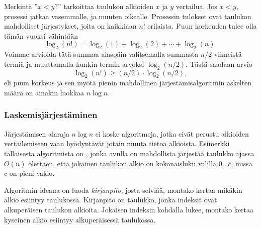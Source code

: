 Merkintä ''$x<y?$'' tarkoittaa taulukon alkioiden
$x$ ja $y$ vertailua.
Jos $x<y$, prosessi jatkaa vasemmalle,
ja muuten oikealle.
Prosessin tulokset ovat taulukon mahdolliset
järjestykset, joita on kaikkiaan $n!$ erilaista.
Puun korkeuden tulee olla tämän vuoksi vähintään
\[ \log_2(n!) = \log_2(1)+\log_2(2)+\cdots+\log_2(n).\]
Voimme arvioida tätä summaa alaspäin
valitsemalla summasta $n/2$
viimeistä termiä ja muuttamalla kunkin
termin arvoksi $\log_2(n/2)$.
Tästä saadaan arvio
\[ \log_2(n!) \ge (n/2) \cdot \log_2(n/2),\]
eli puun korkeus ja sen myötä
pienin mahdollinen järjestämisalgoritmin askelten
määrä on ainakin luokkaa $n \log n$.

\subsubsection{Laskemisjärjestäminen}


Järjestämisen alaraja $n \log n$ ei koske algoritmeja,
jotka eivät perustu alkioiden vertailemiseen
vaan hyödyntävät jotain muuta tietoa alkioista.
Esimerkki tällaisesta algoritmista on
, jonka avulla
on mahdollista järjestää
taulukko ajassa $O(n)$ olettaen,
että jokainen taulukon alkio on
kokonaisluku välillä $0 \ldots c$,
missä $c$ on pieni vakio.

Algoritmin ideana on luoda \emph{kirjanpito}, josta selviää,
montako kertaa mikäkin alkio esiintyy taulukossa.
Kirjanpito on taulukko, jonka indeksit ovat alkuperäisen
taulukon alkioita.
Jokaisen indeksin kohdalla lukee, montako kertaa
kyseinen alkio esiintyy alkuperäisessä taulukossa.

